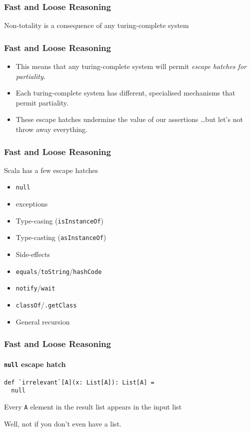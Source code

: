 \begin{frame}[fragile]
\frametitle{Fast and Loose Reasoning}
\begin{fact}Non-totality is a consequence of any turing-complete system\end{fact}
\end{frame}

\begin{frame}[fragile]
\frametitle{Fast and Loose Reasoning}
\begin{itemize}
  \item This means that any turing-complete system will permit \emph{escape hatches for partiality}.
  \item Each turing-complete system has different, specialised mechanisms that permit partiality.
  \item These escape hatches undermine the value of our assertions \ldots but let's not throw away everything.
\end{itemize}
\end{frame}

\begin{frame}[fragile]
\frametitle{Fast and Loose Reasoning}
\begin{block}{Scala has a few escape hatches}
\begin{itemize}
  \item \lstinline{null}
  \item exceptions
  \item Type-casing (\lstinline{isInstanceOf})
  \item Type-casting (\lstinline{asInstanceOf})
  \item Side-effects
  \item \lstinline{equals}/\lstinline{toString}/\lstinline{hashCode}
  \item \lstinline{notify}/\lstinline{wait}
  \item \lstinline{classOf}/\lstinline{.getClass}
  \item General recursion
\end{itemize}
\end{block}
\end{frame}

\begin{frame}[fragile]
\frametitle{Fast and Loose Reasoning}
\framesubtitle{\lstinline{null} escape hatch}
\begin{lstlisting}[style=scala]
def `irrelevant`[A](x: List[A]): List[A] = 
  null
\end{lstlisting}
\begin{theorem}Every \lstinline{A} element in the result list appears in the input list\end{theorem}
Well, not if you don't even have a list.
\end{frame}

